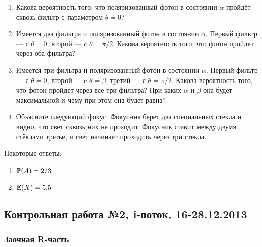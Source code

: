 \documentclass[12pt, a4paper]{article}\usepackage[]{graphicx}\usepackage[]{color}
\begin{document}
\begin{enumerate}
\begin{enumerate}
\item Какова вероятность того, что поляризованный фотон в состоянии $\alpha$ пройдёт сквозь фильтр с параметром $\theta=0$?
\item Имеется два фильтра и поляризованный фотон в состоянии $\alpha$. Первый фильтр — с $\theta=0$, второй — c $\theta=\pi/2$. Какова вероятность того, что фотон пройдет через оба фильтра?
\item Имеется три фильтра и поляризованный фотон в состоянии $\alpha$. Первый фильтр — с $\theta=0$, второй — c $\theta=\beta$, третий — с $\theta=\pi/2$. Какова вероятность того, что фотон пройдет через все три фильтра? При каких $\alpha$ и $\beta$ она будет максимальной и чему при этом она будет равна?
\item Объясните следующий фокус. Фокусник берет два специальных стекла и видно, что свет сквозь них не проходит. Фокусник ставит между двумя стёклами третье, и свет начинает проходить через три стекла.
\end{enumerate}


\end{enumerate}

Некоторые ответы:
\begin{enumerate}
\item $\P(A)=2/3$
\item $\E(X)=5.5$
\end{enumerate}


\subsection{Контрольная работа №2, i-поток, 16-28.12.2013}

\subsubsection*{Заочная R-часть}
\end{document}
